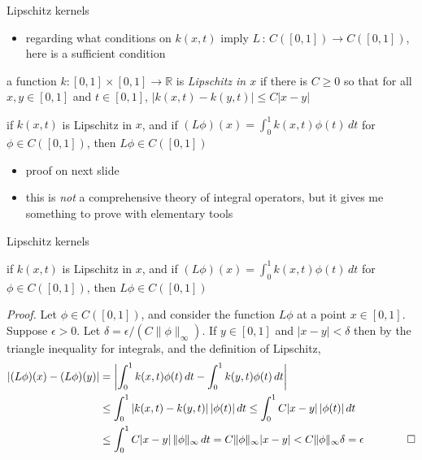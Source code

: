 \documentclass[10pt,
               svgnames,
               hyperref={colorlinks,
                         citecolor=DeepPink4,
                         linkcolor=FireBrick,
                         urlcolor=Maroon},
               usepdftitle=false]{beamer}
\newcommand{\RR}{\mathbb{R}}
\newcommand{\eps}{\epsilon}
\begin{document}
\begin{frame}{Lipschitz kernels}

\begin{itemize}
\item regarding what conditions on $k(x,t)$ imply $L\,:\,C([0,1])\to C([0,1])$, here is a sufficient condition
\end{itemize}

\begin{definition}
a function $k:[0,1]\times [0,1] \to \RR$ is \emph{Lipschitz in $x$} if there is $C\ge 0$ so that for all $x,y \in [0,1]$ and $t\in[0,1]$, \quad $|k(x,t)-k(y,t)|\le C |x-y|$
\end{definition}

\begin{lemma}
if $k(x,t)$ is Lipschitz in $x$, and if $(L\phi)(x) = \int_0^1 k(x,t) \phi(t)\,dt$ for $\phi \in C([0,1])$, then $L\phi \in C([0,1])$
\end{lemma}

\begin{itemize}
\item proof on next slide
\item this is \emph{not} a comprehensive theory of integral operators, but it gives me something to prove with elementary tools
\end{itemize}
\end{frame}


\begin{frame}{Lipschitz kernels}

\begin{lemma}
if $k(x,t)$ is Lipschitz in $x$, and if $(L\phi)(x) = \int_0^1 k(x,t) \phi(t)\,dt$ for $\phi \in C([0,1])$, then $L\phi \in C([0,1])$
\end{lemma}

{\small
\noindent \emph{Proof.}  Let $\phi\in C([0,1])$, and consider the function $L\phi$ at a point $x\in[0,1]$.  Suppose $\eps>0$.  Let $\delta=\eps/(C\|\phi\|_\infty)$.  If $y\in[0,1]$ and $|x-y|<\delta$ then by the triangle inequality for integrals, and the definition of Lipschitz,
\begin{align*}
\left|(L\phi)(x) - (L\phi)(y)\right| &= \left|\int_0^1 k(x,t) \phi(t)\,dt - \int_0^1 k(y,t) \phi(t)\,dt\right| \\
  &\le \int_0^1 \left|k(x,t) - k(y,t)\right| |\phi(t)| \,dt \le \int_0^1 C |x-y|\, |\phi(t)| \,dt \\
  &\le \int_0^1 C|x-y|\, \|\phi\|_\infty \,dt = C \|\phi\|_\infty |x-y| < C \|\phi\|_\infty \delta = \eps \qquad \qed
\end{align*}
}
\end{frame}
\end{document}
